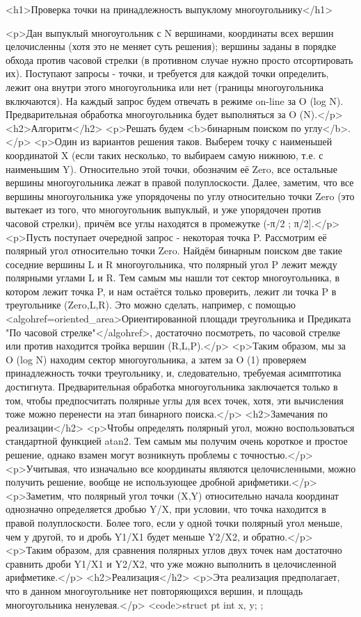 <h1>Проверка точки на принадлежность выпуклому многоугольнику</h1>

<p>Дан выпуклый многоугольник с N вершинами, координаты всех вершин целочисленны (хотя это не меняет суть решения); вершины заданы в порядке обхода против часовой стрелки (в противном случае нужно просто отсортировать их). Поступают запросы - точки, и требуется для каждой точки определить, лежит она внутри этого многоугольника или нет (границы многоугольника включаются). На каждый запрос будем отвечать в режиме on-line за O (log N). Предварительная обработка многоугольника будет выполняться за O (N).</p>
<h2>Алгоритм</h2>
<p>Решать будем <b>бинарным поиском по углу</b>.</p>
<p>Один из вариантов решения таков. Выберем точку с наименьшей координатой X (если таких несколько, то выбираем самую нижнюю, т.е. с наименьшим Y). Относительно этой точки, обозначим её Zero, все остальные вершины многоугольника лежат в правой полуплоскости. Далее, заметим, что все вершины многоугольника уже упорядочены по углу относительно точки Zero (это вытекает из того, что многоугольник выпуклый, и уже упорядочен против часовой стрелки), причём все углы находятся в промежутке (-π/2 ; π/2].</p>
<p>Пусть поступает очередной запрос - некоторая точка P. Рассмотрим её полярный угол относительно точки Zero. Найдём бинарным поиском две такие соседние вершины L и R многоугольника, что полярный угол P лежит между полярными углами L и R. Тем самым мы нашли тот сектор многоугольника, в котором лежит точка P, и нам остаётся только проверить, лежит ли точка P в треугольнике (Zero,L,R). Это можно сделать, например, с помощью <algohref=oriented_area>Ориентированной площади треугольника и Предиката "По часовой стрелке"</algohref>, достаточно посмотреть, по часовой стрелке или против находится тройка вершин (R,L,P).</p>
<p>Таким образом, мы за O (log N) находим сектор многоугольника, а затем за O (1) проверяем принадлежность точки треугольнику, и, следовательно, требуемая асимптотика достигнута. Предварительная обработка многоугольника заключается только в том, чтобы предпосчитать полярные углы для всех точек, хотя, эти вычисления тоже можно перенести на этап бинарного поиска.</p>
<h2>Замечания по реализации</h2>
<p>Чтобы определять полярный угол, можно воспользоваться стандартной функцией atan2. Тем самым мы получим очень короткое и простое решение, однако взамен могут возникнуть проблемы с точностью.</p>
<p>Учитывая, что изначально все координаты являются целочисленными, можно получить решение, вообще не использующее дробной арифметики.</p>
<p>Заметим, что полярный угол точки (X,Y) относительно начала координат однозначно определяется дробью Y/X, при условии, что точка находится в правой полуплоскости. Более того, если у одной точки полярный угол меньше, чем у другой, то и дробь Y1/X1 будет меньше Y2/X2, и обратно.</p>
<p>Таким образом, для сравнения полярных углов двух точек нам достаточно сравнить дроби Y1/X1 и Y2/X2, что уже можно выполнить в целочисленной арифметике.</p>
<h2>Реализация</h2>
<p>Эта реализация предполагает, что в данном многоугольнике нет повторяющихся вершин, и площадь многоугольника ненулевая.</p>
<code>struct pt {
	int x, y;
};

